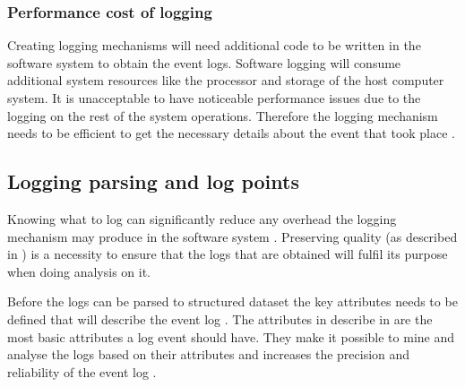 \subsubsection{Performance cost of logging} 
Creating logging mechanisms will need additional code to be written in the software system to obtain the event logs. Software logging will consume additional system resources like the processor and storage of the host computer system. It is unacceptable to have noticeable performance issues due to the logging on the rest of the system operations. Therefore the logging mechanism needs to be efficient to get the necessary details about the event that took place \cite{Zhu2015,Zhu2019}. 

\clearpage

\subsection{Logging parsing and log points}\label{sec:ch1_loggignPoints}
Knowing what to log can significantly reduce any overhead the logging mechanism may produce in the software system \cite{Jia2018, Pecchia2015}. Preserving quality (as described in ) is a necessity to ensure that the logs that are obtained will fulfil its purpose when doing analysis on it.\par Before the logs can be parsed to structured dataset the key attributes needs to be defined that will describe the event log \cite{Bekeneva2020}. The attributes in describe in  are the most basic attributes a log event should have. They make it possible to mine and analyse the logs based on their attributes and increases the precision and reliability of the event log \cite{Kherbouche2017}.

